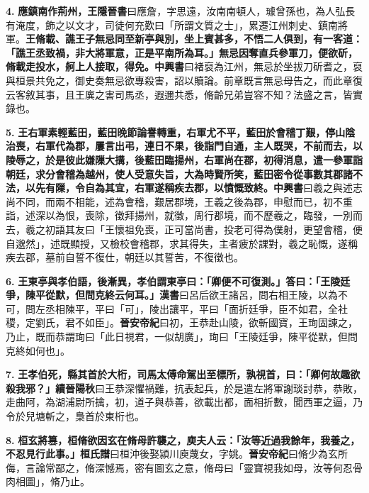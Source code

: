 \textbf{4.} \textbf{應鎮南作荊州，}{\footnotesize \textbf{王隱晉書}曰應詹，字思遠，汝南南頓人，璩曾孫也，為人弘長有淹度，飾之以文才，司徒何充歎曰「所謂文質之士」，累遷江州刺史、鎮南將軍。}\textbf{王脩載、譙王子無忌同至新亭與別，坐上賓甚多，不悟二人俱到，有一客道：「譙王丞致禍，非大將軍意，正是平南所為耳。」無忌因奪直兵參軍刀，便欲斫，脩載走投水，舸上人接取，得免。}{\footnotesize \textbf{中興書}曰褚裒為江州，無忌於坐拔刀斫耆之，裒與桓景共免之，御史奏無忌欲專殺害，詔以贖論。前章既言無忌母告之，而此章復云客敘其事，且王廙之害司馬丞，遐邇共悉，脩齡兄弟豈容不知？法盛之言，皆實錄也。}

\textbf{5.} \textbf{王右軍素輕藍田，藍田晚節論譽轉重，右軍尤不平，藍田於會稽丁艱，停山陰治喪，右軍代為郡，屢言出弔，連日不果，後詣門自通，主人既哭，不前而去，以陵辱之，於是彼此嫌隟大搆，後藍田臨揚州，右軍尚在郡，初得消息，遣一參軍詣朝廷，求分會稽為越州，使人受意失旨，大為時賢所笑，藍田密令從事數其郡諸不法，以先有隟，令自為其宜，右軍遂稱疾去郡，以憤慨致終。}{\footnotesize \textbf{中興書}曰羲之與述志尚不同，而兩不相能，述為會稽，艱居郡境，王羲之後為郡，申慰而已，初不重詣，述深以為恨，喪除，徵拜揚州，就徵，周行郡境，而不歷羲之，臨發，一別而去，羲之初語其友曰「王懷祖免喪，正可當尚書，投老可得為僕射，更望會稽，便自邈然」，述既顯授，又檢校會稽郡，求其得失，主者疲於課對，羲之恥慨，遂稱疾去郡，墓前自誓不復仕，朝廷以其誓苦，不復徵也。}

\textbf{6.} \textbf{王東亭與孝伯語，後漸異，孝伯謂東亭曰：「卿便不可復測。」答曰：「王陵廷爭，陳平從默，但問克終云何耳。」}{\footnotesize \textbf{漢書}曰呂后欲王諸呂，問右相王陵，以為不可，問左丞相陳平，平曰「可」，陵出讓平，平曰「面折廷爭，臣不如君，全社稷，定劉氏，君不如臣」。\textbf{晉安帝紀}曰初，王恭赴山陵，欲斬國寶，王珣固諫之，乃止，既而恭謂珣曰「此日視君，一似胡廣」，珣曰「王陵廷爭，陳平從默，但問克終如何也」。}

\textbf{7.} \textbf{王孝伯死，縣其首於大桁，司馬太傅命駕出至標所，孰視首，曰：「卿何故趣欲殺我邪？」}{\footnotesize \textbf{續晉陽秋}曰王恭深懼禍難，抗表起兵，於是遣左將軍謝琰討恭，恭敗，走曲阿，為湖浦尉所擒，初，道子與恭善，欲載出都，面相折數，聞西軍之逼，乃令於兒塘斬之，梟首於東桁也。}

\textbf{8.} \textbf{桓玄將篡，桓脩欲因玄在脩母許襲之，庾夫人云：「汝等近過我餘年，我養之，不忍見行此事。」}{\footnotesize \textbf{桓氏譜}曰桓沖後娶潁川庾蔑女，字姚。\textbf{晉安帝紀}曰脩少為玄所侮，言論常鄙之，脩深憾焉，密有圖玄之意，脩母曰「靈寶視我如母，汝等何忍骨肉相圖」，脩乃止。}